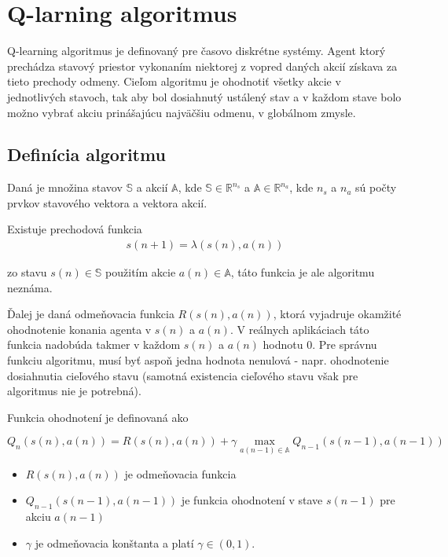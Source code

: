 \chapter{Q-larning algoritmus}

Q-learning algoritmus je definovaný pre časovo diskrétne systémy.
Agent ktorý prechádza stavový priestor vykonaním niektorej z vopred daných
akcií získava za tieto prechody odmeny. Cieľom algoritmu je ohodnotiť všetky akcie
v jednotlivých stavoch, tak aby bol dosiahnutý ustálený stav a v každom stave
bolo možno vybrať akciu prinášajúcu najväčšiu odmenu, v globálnom zmysle.


\section{Definícia algoritmu}

Daná je množina stavov $\mathbb{S}$ a akcií $\mathbb{A}$, kde
 $\mathbb{S} \in \mathbb{R}^{n_s}$ a $\mathbb{A} \in \mathbb{R}^{n_a}$, kde
$n_s$ a  $n_a$ sú počty prvkov stavového vektora a vektora akcií.

Existuje prechodová funkcia
\begin{align}
        s(n+1) = \lambda(s(n), a(n))
\end{align}

zo stavu $s(n) \in \mathbb{S}$ použitím akcie $a(n) \in \mathbb{A}$, táto funkcia je ale algoritmu neznáma.

Ďalej je daná odmeňovacia funkcia $R(s(n),a(n))$, ktorá vyjadruje okamžité ohodnotenie konania
agenta v $s(n)$ a $a(n)$. V reálnych aplikáciach táto funkcia nadobúda takmer v každom
$s(n)$ a $a(n)$ hodnotu $0$. Pre správnu funkciu algoritmu, musí byť aspoň jedna hodnota
nenulová - napr. ohodnotenie dosiahnutia cieľového stavu (samotná existencia cieľového
stavu však pre algoritmus nie je potrebná).

Funkcia ohodnotení je definovaná ako

\begin{equation}
Q_{n}(s(n),a(n)) = R(s(n),a(n)) + \gamma \max_{a(n-1) \in \mathbb{A}} Q_{n-1}(s(n-1), a(n-1))
\label{eq:q_learning}
\end{equation}

\begin{itemize}
 \item $R(s(n),a(n))$ je odmeňovacia funkcia
 \item $Q_{n-1}(s(n-1),a(n-1))$ je funkcia ohodnotení v stave $s(n-1)$ pre akciu $a(n-1)$
 \item $\gamma$ je odmeňovacia konštanta a platí $\gamma \in (0, 1)$.
\end{itemize}


